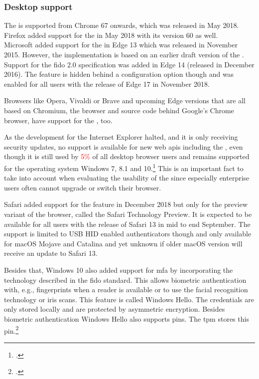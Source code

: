 \subsubsection{Desktop support}

The \wa{} is supported from Chrome 67 onwards, which was released in May 2018. Firefox added support for the \wa{} in May 2018 with its version 60 as well.\\
Microsoft added support for the \wa{} in Edge 13 which was released in November 2015. However, the implementation is based on an earlier draft version of the \wa. Support for the \gls{fido} 2.0 specification was added in Edge 14 (released in December 2016). The feature is hidden behind a configuration option though and was enabled for all users with the release of Edge 17 in November 2018.

Browsers like Opera, Vivaldi or Brave and upcoming Edge versions that are all based on Chromium, the browser and source code behind Google's Chrome browser, have support for the \wa, too.

As the development for the Internet Explorer halted, and it is only receiving security updates, no support is available for new web \glspl{api} including the \wa, even though it is still used by \textcolor{red}{5\%} of all desktop browser users and remains supported for the operating system Windows 7, 8.1 and 10.\footcite[See][]{ie-support}
 This is an important fact to take into account when evaluating the usability of the \wa{} since especially enterprise users often cannot upgrade or switch their browser.

Safari added support for the \wa{} feature in December 2018 but only for the preview variant of the browser, called the Safari Technology Preview. It is expected to be available for all users with the release of Safari 13 in mid to end September. The support is limited to USB HID enabled authenticators though and only available for macOS Mojave and Catalina and yet unknown if older macOS version will receive an update to Safari 13.

Besides that, Windows 10 also added support for \gls{mfa} by incorporating the technology described in the \gls{fido} standard. This allows biometric authentication with, e.g., fingerprints when a reader is available or to use the facial recognition technology or iris scans. This feature is called \frqq Windows Hello\flqq{}. The credentials are only stored locally and are protected by asymmetric encryption. Besides biometric authentication Windows Hello also supports \glspl{pin}. The \gls{tpm} stores this \gls{pin}.\footcite{201612}

